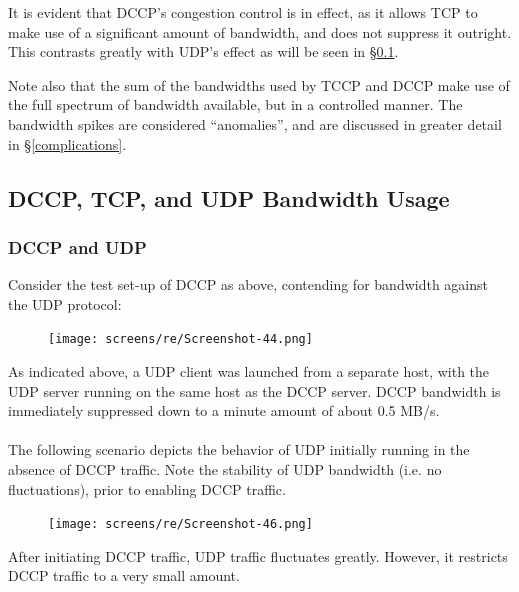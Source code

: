 \documentclass[10pt,a4paper]{article}
\begin{document}
It is evident that DCCP's congestion control is in effect, as it allows TCP to
make use of a significant amount of bandwidth, and does not suppress it
outright. This contrasts greatly with UDP's effect as will be seen in
\S\ref{contention}.


Note also that the sum of the bandwidths used by TCCP and DCCP make use of the full spectrum of bandwidth available,
but in a controlled manner. The bandwidth spikes are considered ``anomalies'',
and are discussed in greater detail in \S\ref{complications}.


\subsection{DCCP, TCP, and UDP Bandwidth Usage}
\label{contention}
\subsubsection{DCCP and UDP}
Consider the test set-up of DCCP as above, contending for bandwidth against the UDP
protocol:

\begin{figure}[!h]
\begin{center}
\hspace*{-65pt}
\texttt{[image: screens/re/Screenshot-44.png]}
\end{center}
\end{figure}

As indicated above, a UDP client was launched from a separate host, with the
UDP server running on the same host as the DCCP server. DCCP bandwidth
is immediately suppressed down to a minute amount of about
0.5 MB/s. 
\paragraph{}
The following scenario depicts the behavior of UDP initially running in the absence of DCCP traffic.
Note the stability of UDP bandwidth (i.e. no fluctuations), 
prior to enabling DCCP traffic.

\begin{figure}[!h]
\begin{center}
\hspace*{-65pt}
\texttt{[image: screens/re/Screenshot-46.png]}
\end{center}
\end{figure}

After initiating DCCP traffic, UDP traffic fluctuates greatly. However, it restricts DCCP
traffic to a very small amount.
\end{document}
